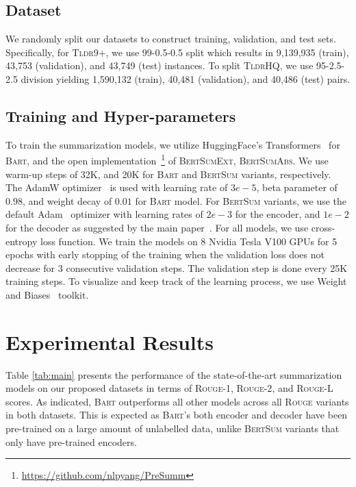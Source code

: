 \documentclass[11pt]{article}
\newcommand{\tldrl}{\textsc{Tldr9+}}
\newcommand{\tldrs}{\textsc{TldrHQ}}
\begin{document}
\subsection{Dataset}
We randomly split our datasets to construct training, validation, and test sets. Specifically, for \tldrl , we use 99-0.5-0.5 split which results in 9,139,935 (train), 43,753 (validation), and 43,749 (test) instances. To split \tldrs , we use 95-2.5-2.5 division yielding 1,590,132 (train), 40,481 (validation), and 40,486 (test) pairs.

\subsection{Training and Hyper-parameters}
To train the summarization models, we utilize HuggingFace's Transformers~\cite{Wolf2020Transformers} for \textsc{Bart}, and the open implementation~\footnote{\url{https://github.com/nlpyang/PreSumm}} of \textsc{BertSumExt}, \textsc{BertSumAbs}. We use warm-up steps of 32K, and 20K for \textsc{Bart} and \textsc{BertSum} variants, respectively. The AdamW optimizer~\cite{Loshchilov2019DecoupledWD} is used with learning rate of $3e-5$, beta parameter of $0.98$, and weight decay of $0.01$ for \textsc{Bart} model. For \textsc{BertSum} variants, we use the default Adam~\cite{Kingma2015AdamAM} optimizer with learning rates of $2e-3$ for the encoder, and $1e-2$ for the decoder as suggested by the main paper~\cite{Liu2019TextSW}. For all models, we use cross-entropy loss function. We train the models on 8 Nvidia Tesla V100 GPUs for 5 epochs with early stopping of the training when the validation loss does not decrease for 3 consecutive validation steps. The validation step is done every 25K training steps. To visualize and keep track of the learning process, we use Weight and Biases~\cite{wandb} toolkit.

 


\section{Experimental Results}
Table \ref{tab:main} presents the performance of the state-of-the-art summarization models on our proposed datasets in terms of \textsc{Rouge-1}, \textsc{Rouge-2}, and \textsc{Rouge-L} scores. As indicated, \textsc{Bart} outperforms all other models across all \textsc{Rouge} variants in both datasets. This is expected as \textsc{Bart}'s both encoder and decoder have been pre-trained on a large amount of unlabelled data, unlike \textsc{BertSum} variants that only have pre-trained encoders. 
\end{document}
